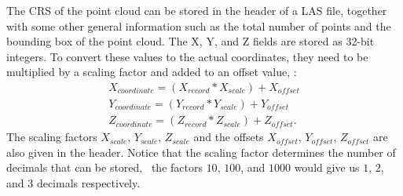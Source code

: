 The CRS of the point cloud can be stored in the header of a LAS file, together with some other general information such as the total number of points and the bounding box of the point cloud. 
The X, Y, and Z fields are stored as 32-bit integers. 
To convert these values to the actual coordinates, they need to be multiplied by a scaling factor and added to an offset value, \ie:
\begin{gather*}
  X_{coordinate} = (X_{record} * X_{scale}) + X_{offset} \\
  Y_{coordinate} = (Y_{record} * Y_{scale}) + Y_{offset} \\
  Z_{coordinate} = (Z_{record} * Z_{scale}) + Z_{offset}.
\end{gather*}
The scaling factors $X_{scale}$, $Y_{scale}$, $Z_{scale}$ and the offsets $X_{offset}$, $Y_{offset}$, $Z_{offset}$ are also given in the header. Notice that the scaling factor determines the number of decimals that can be stored, \eg\ the factors $10$, $100$, and $1000$ would give us $1$, $2$, and $3$ decimals respectively.

